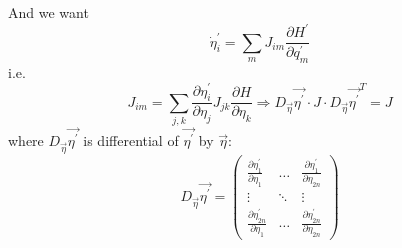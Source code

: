 And we want
$$\dot{\eta}_i^\prime = \sum_m J_{im} \frac{\partial H^\prime}{\partial q^\prime_m}$$ 
i.e.
$$J_{im} = \sum_{j,k}\frac{\partial \eta^\prime_i}{\partial \eta_j}  J_{jk}  \frac{\partial H}{\partial \eta_k} \Rightarrow D_{\vec{\eta}} \vec{\eta^\prime} \cdot J \cdot D_{\vec{\eta}} \vec{\eta^\prime}^T  = J$$ 
where $D_{\vec{\eta}} \vec{\eta^\prime}$ is differential of $\vec{\eta^\prime}$ by $\vec{\eta}$:
$$D_{\vec{\eta}} \vec{\eta^\prime} = \begin{pmatrix}
\frac{\partial \eta^\prime_1}{\partial \eta_1}  & \dots & \frac{\partial \eta^\prime_1}{\partial \eta_{2n}}  \\\vdots & \ddots & \vdots \\
\frac{\partial \eta^\prime_{2n}}{\partial \eta_1}  & \dots & \frac{\partial \eta^\prime_{2n}}{\partial \eta_{2n}} 
\end{pmatrix}$$

